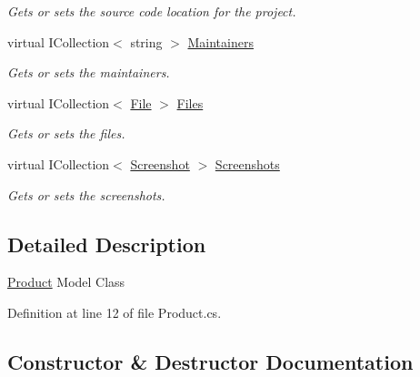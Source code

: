 \begin{DoxyCompactItemize}
\begin{DoxyCompactList}\small\item\em Gets or sets the source code location for the project. \end{DoxyCompactList}\item 
virtual I\+Collection$<$ string $>$ \hyperlink{class_open_1_1_g_i_1_1hypermart_1_1_models_1_1_product_af39b6e12bee2265db7bbca5ecbeb116c}{Maintainers}
\begin{DoxyCompactList}\small\item\em Gets or sets the maintainers. \end{DoxyCompactList}\item 
virtual I\+Collection$<$ \hyperlink{class_open_1_1_g_i_1_1hypermart_1_1_models_1_1_file}{File} $>$ \hyperlink{class_open_1_1_g_i_1_1hypermart_1_1_models_1_1_product_a8632e80d5f05c8818c289b3924137c13}{Files}
\begin{DoxyCompactList}\small\item\em Gets or sets the files. \end{DoxyCompactList}\item 
virtual I\+Collection$<$ \hyperlink{class_open_1_1_g_i_1_1hypermart_1_1_models_1_1_screenshot}{Screenshot} $>$ \hyperlink{class_open_1_1_g_i_1_1hypermart_1_1_models_1_1_product_a5fae1aafb8f9a3af27ce369d5d053df1}{Screenshots}
\begin{DoxyCompactList}\small\item\em Gets or sets the screenshots. \end{DoxyCompactList}\end{DoxyCompactItemize}


\subsection{Detailed Description}
\hyperlink{class_open_1_1_g_i_1_1hypermart_1_1_models_1_1_product}{Product} Model Class 



Definition at line 12 of file Product.\+cs.



\subsection{Constructor \& Destructor Documentation}
\hypertarget{class_open_1_1_g_i_1_1hypermart_1_1_models_1_1_product_a6e3b824c07f190baa506f9c73da63e62}{}
